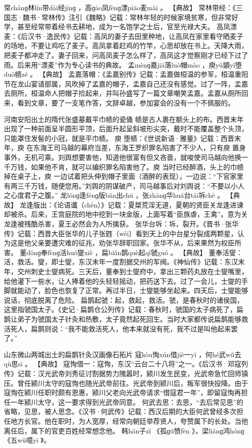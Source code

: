 \documentclass[12pt,UTF8]{ctexbook}
\begin{document}
常chánɡ林lín带dài经jīnɡ
，高ɡāo凤fènɡ漂piāo麦mài
。
【典故】
常林带经：《三国志·魏书·常林传》注引《魏略》记载：常林年轻的时候家境贫寒，但非常好学，甚至经常带着经书去耕地，成为一名饱学之士后，官至光禄大夫。
高凤漂麦：《后汉书·逸民传》记载：高凤的妻子去田里种地，让高凤在家里看守晒麦子的场地，不要让鸡吃了麦子。高凤拿着赶鸡的竹竿，心思却放在书上。天降大雨，把麦子都冲走了。妻子回来，问高凤麦子怎么样了，高凤这才觉察刚才已经下过了雨。后来用“漂麦”作为专心读书的典故。
孟mènɡ嘉jiā落luò帽mào
，庾yǔ顗yǐ堕duò帻zé
。
【典故】
孟嘉落帽：《孟嘉别传》记载：孟嘉做桓温的参军，桓温重阳节在龙山宴请部属，风吹掉了孟嘉的帽子，孟嘉自己还没有感觉。过了一阵，孟嘉去厕所，桓温命人把帽子捡起来，并叫孙盛写了一篇文章嘲笑孟嘉。孟嘉从厕所回来，看到文章，要了一支笔作答，文辞卓越，参加宴会的没有一个不佩服的。

河南安阳出土的隋代张盛墓戴平巾帻的瓷俑
帻是古人裹在额头上的布。西晋末年出现了一种前面呈半圆形平顶，后面升起呈斜坡形尖突，戴时不能覆盖整个头顶，只能罩住发髻的小冠，就是平巾帻。
庾
堕帻：《世说新语·雅量》记载：西晋末年，庾
在东海王司马越的幕府当差，东海王罗织罪名陷害了不少人，只有庾
置身事外，无机可乘。刘舆想要害他，知道他很富有但又吝啬，就唆使司马越向他换一千万钱，如果他不肯，就可以编织罪名陷害他了。庾
当时已经醉酒，头上的巾帻掉在桌子上，庾 一边试着把头伸到帽子里面（酒醉的表现），一边说：“下官家里有两三千万钱，随便您用。”刘舆的阴谋破产，司马越事后对刘舆说：“不要以小人之心度君子之腹。”
龙lónɡ逢fénɡ版bǎn出chū
，张zhānɡ华huá台tái坼chè
。
【典故】
龙逢版出：《论语谶（chèn）》记载：夏桀荒淫无道，夏朝的贤臣关龙逢进谏却被杀。后来，王宫庭院的地中挖到一块金版，上面写着“臣族虐，王禽”。意为关龙逢被残酷杀害，夏王必然会为人所擒获。
张华台坼：坼，裂开。《晋书·张华传》记载：西晋大臣张华的儿子张韪（wěi）看到天上的中台星分裂成两颗星，认为这是他父亲要遭灾难的征兆，劝张华辞职回家。张华不从，后来果然为权臣所害。
董dǒnɡ奉fènɡ活huó燮xiè
，扁biǎn鹊què起qǐ虢guó
。
【典故】
董奉活燮：活，救活。燮，即士燮，东汉末年一度割据交州的军阀。《神仙传》记载：东汉末年，交州刺史士燮病死。三天后，董奉到士燮府中，拿出三颗药丸放在士燮嘴里，给他灌下一些水，让人捧着他的头轻轻摇动，把药送下去。过了一会儿，士燮的手脚就能动了，脸色也恢复了正常。再过半日，士燮能够坐起来。四天后，士燮能够说话，彻底脱离了危险。
扁鹊起虢：起，救起，救活。虢，是春秋时的诸侯国，这里指虢国太子。《史记·扁鹊仓公列传》记载：春秋时，虢国的太子病死了，扁鹊让弟子为虢国太子针灸和热敷，太子竟然起死回生。当时大家都传说扁鹊能够救活死人，扁鹊则说：“我不能救活死人，他本来就没有死，我不过是叫他起来罢了。”

山东微山两城出土的扁鹊针灸汉画像石拓片
寇kòu恂xún借jiè一yī
，何hé武wǔ去qù思sī
。
【典故】
寇恂借一：寇恂，东汉“云台二十八将”之一。《后汉书·邓寇列传》记载：汉光武帝刘秀征讨割据势力隗嚣时，颍川发生民变，光武帝急忙回师镇压。曾任颍川太守的寇恂也随光武帝前往。光武帝到颍川后，叛军很快投降。由于寇恂在颍川任职时颇有恩惠，颍川父老向光武帝请求“借寇君一年”，即留寇恂再担任一年颍川太守，这一要求得到光武帝同意。
何武去思：去思，“去后常见思”的省略，见思，被人思念。《汉书·何武传》记载：西汉后期的大臣何武曾经多次担任地方长官。他在职时，为人宽厚，经常向朝廷举荐贤人，夸赞属下的长处。当他离任后，属下的官吏百姓经常想念他。
韩hán子zǐ
《孤ɡū愤fèn
》，梁liánɡ鸿hónɡ
《五wǔ噫yī
》。
\end{document}
